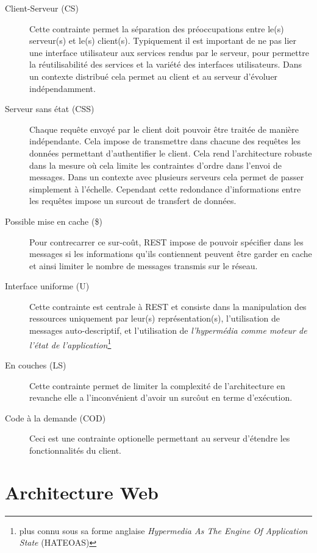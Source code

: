 \documentclass[a4paper, 11pt]{report}
\begin{document}
\begin{description}
\item[Client-Serveur (CS)] Cette contrainte permet la séparation des
  préoccupations entre le(s) serveur(s) et le(s) client(s).
  Typiquement il est important de ne pas lier une interface
  utilisateur aux services rendus par le serveur, pour permettre la
  réutilisabilité des services et la variété des interfaces
  utilisateurs.  Dans un contexte distribué cela permet au client et
  au serveur d'évoluer indépendamment.

\item[Serveur sans état (CSS)] Chaque requête envoyé par le client
  doit pouvoir être traitée de manière indépendante.  Cela impose de
  transmettre dans chacune des requêtes les données permettant
  d'authentifier le client.  Cela rend l'architecture robuste dans la
  mesure où cela limite les contraintes d'ordre dans l'envoi de
  messages.  Dans un contexte avec plusieurs serveurs cela permet de
  passer simplement à l'échelle.  Cependant cette redondance
  d'informations entre les requêtes impose un surcout de transfert de
  données.

\item [Possible mise en cache (\$)] Pour contrecarrer ce sur-coût,
  REST impose de pouvoir spécifier dans les messages si les
  informations qu'ils contiennent peuvent être garder en cache et
  ainsi limiter le nombre de messages transmis sur le réseau.

\item[Interface uniforme (U)] Cette contrainte est centrale à REST et
  consiste dans la manipulation des ressources uniquement par leur(s)
  représentation(s), l'utilisation de messages auto-descriptif, et
  l'utilisation de \emph{l'hypermédia comme moteur de l'état de
    l'application}\footnote{plus connu sous sa forme anglaise
    \emph{Hypermedia As The Engine Of Application State} (HATEOAS)}

\item[En couches (LS)] Cette contrainte permet de limiter la
  complexité de l'architecture en revanche elle a l'inconvénient
  d'avoir un surcôut en terme d'exécution.

\item[Code à la demande (COD)] Ceci est une contrainte optionelle
  permettant au serveur d'étendre les fonctionnalités du client.
\end{description}

\section{Architecture Web}
\end{document}
